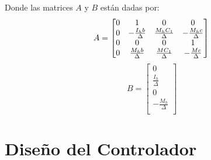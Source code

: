 \documentclass[final,times,twocolumn,5p]{ResumenEjecutivo}
\begin{document}
Donde las matrices $A$ y $B$ están dadas por:
\[
A=
\begin{bmatrix}
0 & 1 & 0 & 0\\
0 & -\frac{I_hb}{\Delta} & \frac{M_hC_1}{\Delta} & -\frac{M_hc}{\Delta}\\
0 & 0 & 0& 1\\
0 & \frac{M_hb}{\Delta} & \frac{MC_1}{\Delta} & -\frac{Mc}{\Delta}\\
\end{bmatrix}\\
\]
\[
B=
\begin{bmatrix}
0\\
\frac{I_h}{\Delta} \\
0\\
-\frac{M_h}{\Delta} \\
\end{bmatrix}
\]
\newpage

\section{Diseño del Controlador}
\end{document}
